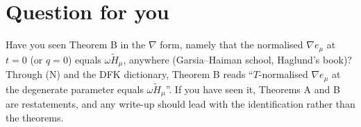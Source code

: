\documentclass[11pt]{article}
\theoremstyle{definition}
\newcommand{\Ht}{\widetilde{H}}
\begin{document}
\section{Question for you}
Have you seen Theorem B in the $\nabla$ form, namely that the normalised $\nabla e_\mu$ at $t=0$ (or $q=0$) equals $\omega\Ht_\mu$, anywhere (Garsia--Haiman school, Haglund's book)? Through (N) and the DFK dictionary, Theorem B reads ``$T$-normalised $\nabla e_\mu$ at the degenerate parameter equals $\omega\Ht_\mu$''. If you have seen it, Theorems A and B are restatements, and any write-up should lead with the identification rather than the theorems.
\end{document}

